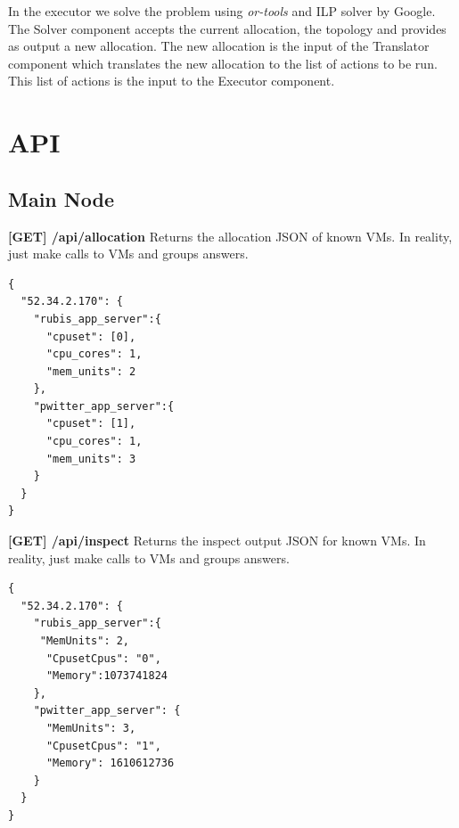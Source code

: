 In the executor we solve the problem using \textit{or-tools} and ILP solver by Google. The Solver component
accepts the current allocation, the topology and provides as output a new allocation. The new allocation is
the input of the Translator component which translates the new allocation to the list of actions to be run.
This list of actions is the input to the Executor component.

\section{API}
\subsection{Main Node}
\textbf{[GET] /api/allocation}
Returns the allocation JSON of known VMs. In reality, just make calls to VMs and groups answers.
\begin{lstlisting}[caption=Example GET allocation output,basicstyle=\tiny]
{
  "52.34.2.170": {
    "rubis_app_server":{  
      "cpuset": [0],
      "cpu_cores": 1,
      "mem_units": 2
    },
    "pwitter_app_server":{  
      "cpuset": [1],
      "cpu_cores": 1,
      "mem_units": 3
    }
  }
}
\end{lstlisting}

\vspace{5mm}
\textbf{[GET] /api/inspect}
Returns the inspect output JSON for known VMs. In reality, just make calls to VMs and groups answers.
\begin{lstlisting}[caption=Example GET inspect output,basicstyle=\tiny]
{
  "52.34.2.170": {  
    "rubis_app_server":{  
     "MemUnits": 2,
      "CpusetCpus": "0",
      "Memory":1073741824
    },
    "pwitter_app_server": {  
      "MemUnits": 3,
      "CpusetCpus": "1",
      "Memory": 1610612736
    }
  } 
}
\end{lstlisting}

